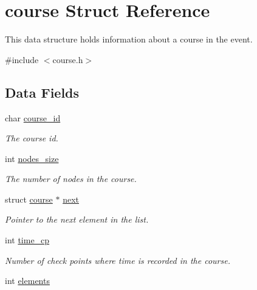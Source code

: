 \hypertarget{structcourse}{\section{course Struct Reference}
\label{structcourse}
}


This data structure holds information about a course in the event.  




{\ttfamily \#include $<$course.\-h$>$}

\subsection*{Data Fields}
{\bf }\par
\begin{DoxyCompactItemize}
\item 
char \hyperlink{structcourse_ab027792ebffb0cdd68865f83ed267ada}{course\-\_\-id}
\begin{DoxyCompactList}\small\item\em The course id. \end{DoxyCompactList}\item 
\hypertarget{structcourse_a8948c972f35b2d8fe360342b3ce5b6db}{int \hyperlink{structcourse_a8948c972f35b2d8fe360342b3ce5b6db}{nodes\-\_\-size}}\label{structcourse_a8948c972f35b2d8fe360342b3ce5b6db}

\begin{DoxyCompactList}\small\item\em The number of nodes in the course. \end{DoxyCompactList}\item 
\hypertarget{structcourse_aa8b271a21f077bd06998d050dd12b42b}{struct \hyperlink{structcourse}{course} $\ast$ \hyperlink{structcourse_aa8b271a21f077bd06998d050dd12b42b}{next}}\label{structcourse_aa8b271a21f077bd06998d050dd12b42b}

\begin{DoxyCompactList}\small\item\em Pointer to the next element in the list. \end{DoxyCompactList}\item 
\hypertarget{structcourse_a9cf188051aa3453cd8ffed0373253c39}{int \hyperlink{structcourse_a9cf188051aa3453cd8ffed0373253c39}{time\-\_\-cp}}\label{structcourse_a9cf188051aa3453cd8ffed0373253c39}

\begin{DoxyCompactList}\small\item\em Number of check points where time is recorded in the course. \end{DoxyCompactList}\item 
\hypertarget{structcourse_a8dad326c13b7ff3faa4b7a69e278faa7}{int \hyperlink{structcourse_a8dad326c13b7ff3faa4b7a69e278faa7}{elements}}\label{structcourse_a8dad326c13b7ff3faa4b7a69e278faa7}


\end{DoxyCompactItemize}

